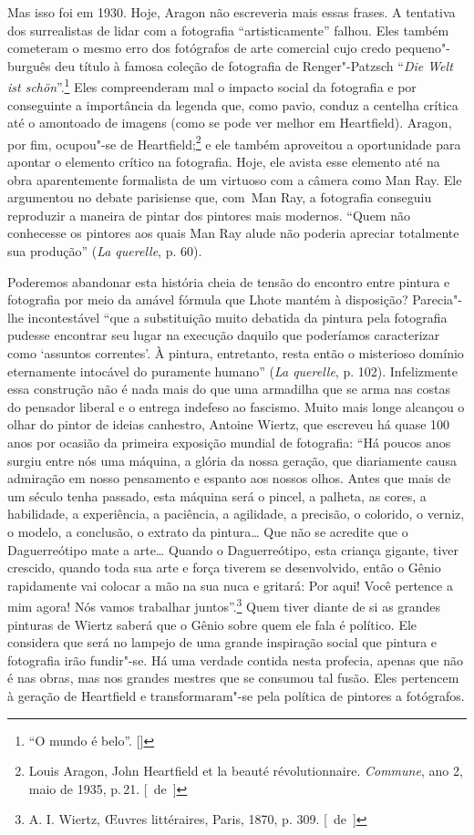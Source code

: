 Mas isso foi em 1930. Hoje, Aragon não escreveria mais essas frases. A
tentativa dos surrealistas de lidar com a fotografia ``artisticamente''
falhou. Eles também cometeram o mesmo erro dos fotógrafos de arte
comercial cujo credo pequeno"-burguês deu título à famosa
coleção de fotografia de Renger"-Patzsch ``\emph{Die Welt ist schön}''.\footnote{``O mundo é belo''. []} Eles compreenderam mal o impacto social da
fotografia e por conseguinte a importância da legenda que, como pavio, conduz a
centelha crítica até o amontoado de imagens (como se pode ver melhor em
Heartfield). Aragon, por fim, ocupou"-se de Heartfield;\footnote{Louis
  Aragon, John Heartfield et la beauté révolutionnaire. \emph{Commune},
  ano 2, maio de 1935, p.\,21. [~de~]} e ele também aproveitou a oportunidade
para apontar o elemento crítico na fotografia. Hoje, ele avista esse
elemento até na obra aparentemente formalista de um virtuoso com a câmera
como Man Ray. Ele argumentou no debate parisiense que, com~Man Ray, a
fotografia conseguiu reproduzir a maneira de pintar dos pintores mais
modernos. ``Quem não conhecesse os pintores aos quais Man Ray alude não
poderia apreciar totalmente sua produção'' (\emph{La querelle}, p. 60).

Poderemos abandonar esta história cheia de tensão do encontro entre
pintura e fotografia por meio da amável fórmula que Lhote mantém à
disposição? Parecia"-lhe incontestável ``que a substituição muito
debatida da pintura pela fotografia pudesse encontrar seu lugar na
execução daquilo que poderíamos caracterizar como `assuntos correntes'. À
pintura, entretanto, resta então o misterioso domínio eternamente
intocável do puramente humano'' (\emph{La querelle}, p. 102).
Infelizmente essa construção não é nada mais do que uma armadilha que
se arma nas costas do pensador liberal e o entrega indefeso ao fascismo.
Muito mais longe alcançou o olhar do pintor de ideias canhestro, Antoine
Wiertz, que escreveu há quase 100 anos por ocasião da primeira exposição
mundial de fotografia: ``Há poucos anos surgiu entre nós uma máquina, a
glória da nossa geração, que diariamente causa admiração em nosso
pensamento e espanto aos nossos olhos. Antes que mais de um século tenha
passado, esta máquina será o pincel, a palheta, as cores, a habilidade,
a experiência, a paciência, a agilidade, a precisão, o colorido, o
verniz, o modelo, a conclusão, o extrato da pintura\ldots{} Que não se
acredite que o Daguerreótipo mate a arte\ldots{} Quando o Daguerreótipo, esta
criança gigante, tiver crescido, quando toda sua arte e força tiverem se
desenvolvido, então o Gênio rapidamente vai colocar a mão na sua nuca e
gritará: Por aqui! Você pertence a mim agora! Nós vamos trabalhar
juntos''.\footnote{A. I. Wiertz, \OE uvres littéraires, Paris, 1870, p. 309. [~de~]}
Quem tiver diante de si as grandes pinturas de Wiertz saberá que o Gênio
sobre quem ele fala é político. Ele considera que será no lampejo de uma
grande inspiração social que pintura e fotografia irão fundir"-se. Há uma
verdade contida nesta profecia, apenas que não é nas obras, mas nos
grandes mestres que se consumou tal fusão. Eles pertencem à geração de
Heartfield e transformaram"-se pela política de pintores a fotógrafos.


